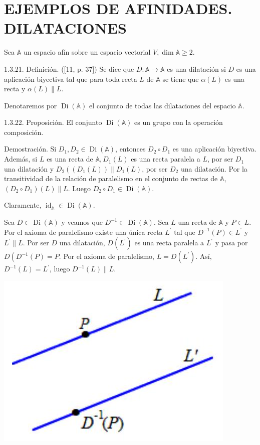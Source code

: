 \documentclass[12pt, a4paper, ones, notitlepage, openany,titlepage]{article}
\begin{document}
\section{EJEMPLOS DE AFINIDADES. DILATACIONES}
Sea $\mathbb{A}$ un espacio afín sobre un espacio vectorial $V, \dim  \mathbb{A} \geq 2$.

1.3.21. Definición. ([11, p. 37]) Se dice que $D: \mathbb{A} \rightarrow \mathbb{A}$ es una dilatación si $D$ es una aplicación biyectiva tal que para toda recta $L$ de $\mathbb{A}$ se tiene que $\alpha(L)$ es una recta y $\alpha(L) \| L$.

Denotaremos por $\operatorname{Di}(\mathbb{A})$ el conjunto de todas las dilataciones del espacio $\mathbb{A}$.

1.3.22. Proposición. El conjunto $\operatorname{Di}(\mathbb{A})$ es un grupo con la operación composición.

Demostración. Si $D_{1}, D_{2} \in \operatorname{Di}(\mathbb{A})$, entonces $D_{2} \circ D_{1}$ es una aplicación biyectiva. Además, si $L$ es una recta de $\mathbb{A}, D_{1}(L)$ es una recta paralela a $L$, por ser $D_{1}$ una dilatación y $D_{2}\left(\left(D_{1}(L)\right) \| D_{1}(L)\right.$, por ser $D_{2}$ una dilatación. Por la transitividad de la relación de paralelismo en el conjunto de rectas de $\mathbb{A}$, $\left(D_{2} \circ D_{1}\right)(L) \| L$. Luego $D_{2} \circ D_{1} \in \operatorname{Di}(\mathbb{A})$.

Claramente, $\operatorname{id}_{\mathbb{A}} \in \operatorname{Di}(\mathbb{A})$.

Sea $D \in \operatorname{Di}(\mathbb{A})$ y veamos que $D^{-1} \in \operatorname{Di}(\mathbb{A})$. Sea $L$ una recta de $\mathbb{A}$ y $P \in L$. Por el axioma de paralelismo existe una única recta $L^{\prime}$ tal que $D^{-1}(P) \in L^{\prime}$ y $L^{\prime} \| L$. Por ser $D$ una dilatación, $D\left(L^{\prime}\right)$ es una recta paralela a $L^{\prime}$ y pasa por $D\left(D^{-1}(P)=P\right.$. Por el axioma de paralelismo, $L=D\left(L^{\prime}\right)$. Así, $D^{-1}(L)=L^{\prime}$, luego $D^{-1}(L) \| L$.

\begin{center}
\includegraphics[max width=\textwidth]{2023_03_01_7659aec5e35f9a9b2d3cg-29}
\end{center}
\end{document}
